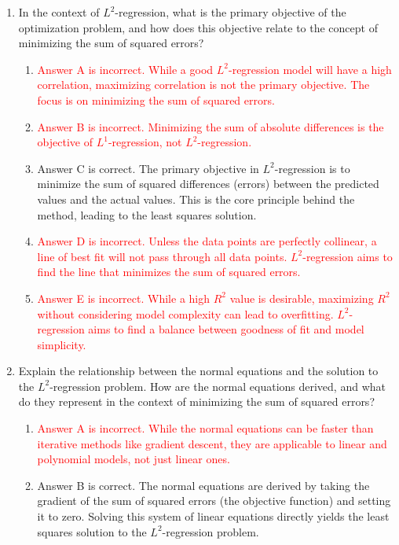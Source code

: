 \documentclass{article}%
\newcommand{\incorrect}[1]{\textcolor{red}{#1}}
\begin{document}
\begin{enumerate}%
\item In the context of $L^2$-regression, what is the primary objective of the optimization problem, and how does this objective relate to the concept of minimizing the sum of squared errors?%
\begin{enumerate}%
\item \incorrect{Answer A is incorrect. While a good $L^2$-regression model will have a high correlation, maximizing correlation is not the primary objective. The focus is on minimizing the sum of squared errors.}%
\item \incorrect{Answer B is incorrect. Minimizing the sum of absolute differences is the objective of $L^1$-regression, not $L^2$-regression.}%
\item Answer C is correct. The primary objective in $L^2$-regression is to minimize the sum of squared differences (errors) between the predicted values and the actual values. This is the core principle behind the method, leading to the least squares solution.%
\item \incorrect{Answer D is incorrect.  Unless the data points are perfectly collinear, a line of best fit will not pass through all data points. $L^2$-regression aims to find the line that minimizes the sum of squared errors.}%
\item \incorrect{Answer E is incorrect. While a high $R^2$ value is desirable, maximizing $R^2$ without considering model complexity can lead to overfitting. $L^2$-regression aims to find a balance between goodness of fit and model simplicity.}%
\end{enumerate}%
\vspace{1em}%
\item Explain the relationship between the normal equations and the solution to the $L^2$-regression problem.  How are the normal equations derived, and what do they represent in the context of minimizing the sum of squared errors?%
\begin{enumerate}%
\item \incorrect{Answer A is incorrect. While the normal equations can be faster than iterative methods like gradient descent, they are applicable to linear and polynomial models, not just linear ones.}%
\item Answer B is correct. The normal equations are derived by taking the gradient of the sum of squared errors (the objective function) and setting it to zero.  Solving this system of linear equations directly yields the least squares solution to the $L^2$-regression problem.%

\end{enumerate}
\end{enumerate}
\end{document}
